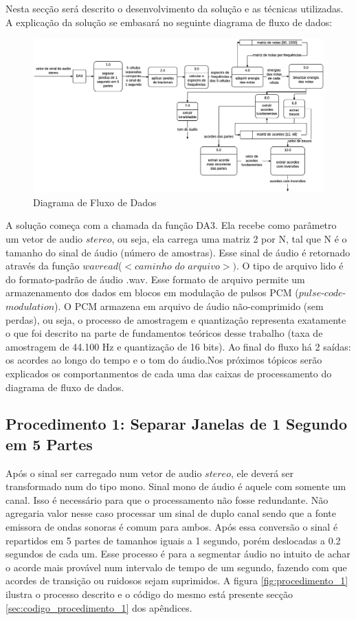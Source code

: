 Nesta secção será descrito o desenvolvimento da solução e as técnicas utilizadas. A explicação da solução se embasará no seguinte diagrama de fluxo de dados:

\begin{figure}[h]
	\centering
		\includegraphics[keepaspectratio=true,scale=0.51]{figuras/dfd_2.eps}
	\caption{Diagrama de Fluxo de Dados}
\end{figure}

A solução começa com a chamada da função DA3. Ela recebe como parâmetro um vetor de audio $stereo$, ou seja, ela carrega uma matriz 2 por N, tal que N é o tamanho do sinal de áudio (número de amostras). Esse sinal de áudio é retornado através da função $wavread$($<$$caminho$ $do$ $arquivo$$>$$)$. O tipo de arquivo lido é do formato-padrão de áudio .wav. Esse formato de arquivo permite um armazenamento dos dados em blocos em modulação de pulsos PCM ($pulse$-$code$-$modulation$). O PCM armazena em arquivo de áudio não-comprimido (sem perdas), ou seja, o processo de amostragem e quantização representa exatamente o que foi descrito na parte de fundamentos teóricos desse trabalho (taxa de amostragem de 44.100 Hz e quantização de 16 bits). Ao final do fluxo há 2 saídas: os acordes ao longo do tempo e o tom do áudio.Nos próximos tópicos serão explicados os comportanmentos de cada uma das caixas de processamento do diagrama de fluxo de dados.

\subsection{Procedimento 1: Separar Janelas de 1 Segundo em 5 Partes}
\label{subsec:procedimento_1}

Após o sinal ser carregado num vetor de audio $stereo$, ele deverá ser transformado num do tipo mono. Sinal mono de áudio é aquele com somente um canal. Isso é necessário para que o processamento não fosse redundante. Não agregaria valor nesse caso processar um sinal de duplo canal sendo que a fonte emissora de ondas sonoras é comum para ambos. Após essa conversão o sinal é repartidos em 5 partes de tamanhos iguais a 1 segundo, porém deslocadas a 0.2 segundos de cada um. Esse processo é para a segmentar áudio no intuito de achar o acorde mais provável num intervalo de tempo de um segundo, fazendo com que acordes de transição ou ruidosos sejam suprimidos. A figura \ref{fig:procedimento_1} ilustra o processo descrito e o código do mesmo está presente secção \ref{sec:codigo_procedimento_1} dos apêndices.

